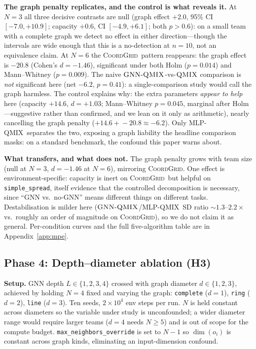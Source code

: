 \documentclass[10pt]{article}
\newcommand{\algoname}[1]{\textsc{#1}}
\newcommand{\qmix}{\algoname{QMIX}}
\newcommand{\gnnqmix}{\algoname{GNN-QMIX}}
\newcommand{\coordgrid}{\textsc{CoordGrid}}
\newcommand{\mlpqmix}{\algoname{MLP-QMIX}}
\newcommand{\PMgraphGapNthree}{+2.0}  %
\newcommand{\PMgraphGapNsix}{-20.8}   %
\newcommand{\PMcapGapNthree}{+0.6}    %
\newcommand{\PMcapGapNsix}{+14.6}     %
\newcommand{\PMgraphDNsix}{-1.46}     %
\newcommand{\PMcapDNsix}{+1.03}       %
\newcommand{\PMgraphHolmNsix}{0.014}  %
\newcommand{\PMgraphMwuNsix}{0.009}   %
\newcommand{\PMcapMwuNsix}{0.045}     %
\newcommand{\PMnetNsix}{-6.2}         %
\begin{document}
\textbf{The graph penalty replicates, and the control is what reveals
it.} At $N{=}3$ all three decisive contrasts are null (graph effect
$\PMgraphGapNthree$, 95\% CI $[-7.0, +10.9]$; capacity $\PMcapGapNthree$,
CI $[-4.9, +6.1]$; both $p>0.6$): on a small
team with a complete graph we detect no effect in either
direction---though the intervals are wide enough that this is a
no-detection at $n{=}10$, not an equivalence claim. At
$N{=}6$ the \coordgrid\ pattern reappears: the graph effect is
$\PMgraphGapNsix$ (Cohen's $d=\PMgraphDNsix$), significant under both Holm
($p=\PMgraphHolmNsix$) and Mann--Whitney ($p=\PMgraphMwuNsix$). The naive $\gnnqmix$-vs-$\qmix$ comparison is \emph{not} significant here
(net $\PMnetNsix$, $p=0.41$): a single-comparison study would call the
graph harmless. The control explains why: the extra parameters \emph{appear
to help}
here (capacity $\PMcapGapNsix$, $d=\PMcapDNsix$; Mann--Whitney
$p=\PMcapMwuNsix$, marginal after Holm---suggestive rather than confirmed,
and we lean on it only as arithmetic), nearly cancelling the graph
penalty ($\PMcapGapNsix\!+\!\PMgraphGapNsix\approx\PMnetNsix$). Only
\mlpqmix\ separates the two, exposing a graph liability the headline
comparison masks: on a standard benchmark, the confound this paper
warns about.

\textbf{What transfers, and what does not.} The graph penalty grows with
team size (null at $N{=}3$, $d=\PMgraphDNsix$ at $N{=}6$), mirroring
\coordgrid. One effect is environment-specific: capacity is inert on
\coordgrid\ but helpful on \texttt{simple\_spread}, itself evidence that
the controlled decomposition is necessary, since ``GNN vs.\ no-GNN'' means
different things on different tasks. Destabilisation is milder here
($\gnnqmix$/\mlpqmix\ SD ratio ${\sim}1.3$--$2.2\times$ vs.\
roughly an order of magnitude on \coordgrid), so we do not claim it as general.
Per-condition curves and the full five-algorithm table are in
Appendix~\ref{app:mpe}.

\subsection{Phase 4: Depth--diameter ablation (H3)}
\label{sec:results:ablation}

\textbf{Setup.} GNN depth $L \in \{1, 2, 3, 4\}$ crossed with graph
diameter $d \in \{1, 2, 3\}$, achieved by holding $N=4$ fixed and
varying the graph: \texttt{complete} ($d=1$), \texttt{ring} ($d=2$),
\texttt{line} ($d=3$). Ten seeds, $2 \times 10^4$ env steps per run.
$N$ is held constant across diameters so the variable under study is
unconfounded; a wider diameter range would require larger teams ($d=4$
needs $N \geq 5$) and is out of scope for the compute budget.
\texttt{max\_neighbors\_override} is set to $N-1$ so $\dim(o_i)$ is
constant across graph kinds, eliminating an input-dimension confound.
\end{document}
